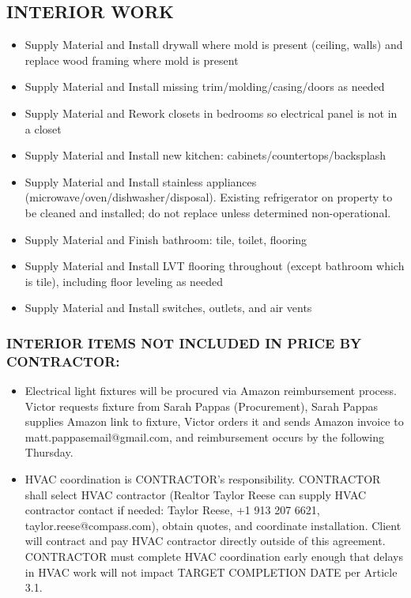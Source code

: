 \documentclass[10pt,letterpaper]{article}
\begin{document}
\subsection{INTERIOR WORK}
\begin{itemize}[leftmargin=*]
\item Supply Material and Install drywall where mold is present (ceiling, walls) and replace wood framing where mold is present
\item Supply Material and Install missing trim/molding/casing/doors as needed
\item Supply Material and Rework closets in bedrooms so electrical panel is not in a closet
\item Supply Material and Install new kitchen: cabinets/countertops/backsplash
\item Supply Material and Install stainless appliances (microwave/oven/dishwasher/disposal). Existing refrigerator on property to be cleaned and installed; do not replace unless determined non-operational.
\item Supply Material and Finish bathroom: tile, toilet, flooring
\item Supply Material and Install LVT flooring throughout (except bathroom which is tile), including floor leveling as needed
\item Supply Material and Install switches, outlets, and air vents
\end{itemize}

\subsubsection{INTERIOR ITEMS NOT INCLUDED IN PRICE BY CONTRACTOR:}
\begin{itemize}[leftmargin=*]
\item Electrical light fixtures will be procured via Amazon reimbursement process. Victor requests fixture from Sarah Pappas (Procurement), Sarah Pappas supplies Amazon link to fixture, Victor orders it and sends Amazon invoice to matt.pappasemail@gmail.com, and reimbursement occurs by the following Thursday.

\item HVAC coordination is CONTRACTOR's responsibility. CONTRACTOR shall select HVAC contractor (Realtor Taylor Reese can supply HVAC contractor contact if needed: Taylor Reese, +1 913 207 6621, taylor.reese@compass.com), obtain quotes, and coordinate installation. Client will contract and pay HVAC contractor directly outside of this agreement. CONTRACTOR must complete HVAC coordination early enough that delays in HVAC work will not impact TARGET COMPLETION DATE per Article 3.1.
\end{itemize}
\end{document}
